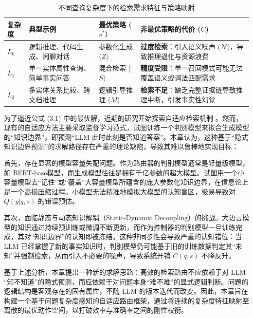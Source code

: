 \begin{table}[htbp]
    \centering
    \caption{不同查询复杂度下的检索需求特征与策略映射}
    \label{tab:query_complexity}
    \renewcommand{\arraystretch}{1.3}
    \begin{tabular}{l p{3.5cm} l p{4.5cm}}
        \toprule
        \textbf{复杂度} & \textbf{典型示例} & \textbf{最优策略 ($s^*$)} & \textbf{非最优策略的代价 ($C$)} \\
        \midrule
        \textbf{$L_0$} & 逻辑推理、代码生成、\newline 闲聊对话 & 参数化生成 ($Z$) & \textbf{过度检索}：引入语义噪声 ($\mathcal{N}$)，导致推理退化与资源浪费 \\
        \textbf{$L_1$} & 单一实体属性查询、\newline 简单事实问答 & 混合检索 ($S$) & \textbf{精度受限}：单一召回模式可能无法覆盖语义或词法匹配需求 \\
        \textbf{$L_2$} & 多实体关系比较、\newline 跨文档推理 & 逻辑引导推理 ($M$) & \textbf{检索不足}：缺乏完整证据链导致推理中断，引发事实性幻觉 \\
        \bottomrule
    \end{tabular}
\end{table}

为了逼近公式 (3.1) 中的最优解，近期的研究开始探索自适应检索机制 \cite{asai2024selfrag, jeong2024adaptive}。然而，现有的自适应方法主要采取监督学习范式，试图训练一个判别模型来拟合生成模型的“知识边界”，即预测“LLM 此时此刻是否知道答案”。本章认为，这种基于“隐式知识边界预测”的求解路径存在严重的理论缺陷，导致其难以鲁棒地实现目标：

首先，存在显著的模型容量失配问题。作为路由器的判别模型通常是轻量级模型，如 BERT-base模型，而生成模型往往是拥有千亿参数的超大模型。试图用一个小容量模型去“记住”或“覆盖”大容量模型所蕴含的庞大参数化知识边界，在信息论上是一个高损压缩过程。小模型无法精准地模拟大模型的认知盲区，极易导致对 $Q(y|q, s)$ 的错误预估。

其次，面临静态与动态知识解耦（Static-Dynamic Decoupling）的挑战。大语言模型的知识通过持续预训练或微调不断更新，而作为控制器的判别模型一旦训练完成，其对“知识边界”的认知即被冻结。这种非同步性会导致严重的认知错位：当 LLM 已经掌握了新的事实知识时，判别模型仍可能基于旧的训练数据判定其“未知”并强制检索，从而引入不必要的噪声，导致系统开销 $C(q,s)$ 不降反升。

基于上述分析，本章提出一种新的求解思路：高效的检索路由不应依赖于对 LLM “知不知道”的隐式预测，而应依赖于对问题本身“难不难”的显式逻辑判断。问题的逻辑结构是客观存在的固有属性，不随 LLM 的版本迭代而改变。因此，本章旨在构建一个基于问题复杂度感知的自适应路由框架，通过将连续的复杂度特征映射至离散的最优动作空间，以打破效率与准确率之间的刚性权衡。

